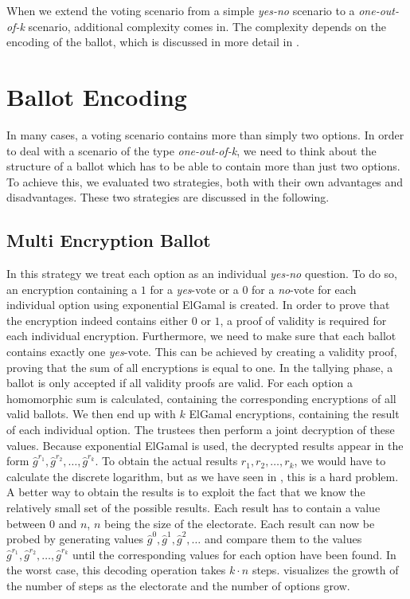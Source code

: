 \documentclass[numbers=noenddot, abstract=on, a4paper, headsepline,
footsepline, oneside, openright, draft=off, listof=leveldown]{scrreprt}
\begin{document}
When we extend the voting scenario from a simple \emph{yes-no} scenario to a
\emph{one-out-of-k} scenario, additional complexity comes in. The complexity
depends on the encoding of the ballot, which is discussed in more detail in
.

\section{Ballot Encoding}
\label{sec:ballotencoding}
In many cases, a voting scenario contains more than simply two options. In order
to deal with a scenario of the type \emph{one-out-of-k}, we need to think about
the structure of a ballot which has to be able to contain more than just two
options. To achieve this, we evaluated two strategies, both with their own
advantages and disadvantages. These two strategies are discussed in the
following.

\subsection{Multi Encryption Ballot}
\label{sec:multiencryptionballot}
In this strategy we treat each option as an individual \emph{yes-no}
question. To do so, an encryption containing a $1$ for a
\emph{yes}-vote or a $0$ for a \emph{no}-vote for each individual option using
exponential ElGamal is created. In order to prove that the encryption indeed
contains either $0$ or $1$, a proof of validity is required for each individual
encryption.
Furthermore, we need to make sure that each ballot contains exactly one
\emph{yes}-vote. This can be achieved by creating a validity proof, proving that
the sum of all encryptions is equal to one. In the
tallying phase, a ballot is only accepted if all validity proofs are valid. For
each option a homomorphic sum is calculated, containing the corresponding
encryptions of all valid ballots. We then end up with $k$ ElGamal encryptions,
containing the result of each individual option. The trustees then perform a
joint decryption of these values. Because exponential ElGamal is used, the
decrypted results appear in the form $\hat{g}^{r_1}, \hat{g}^{r_2}, \ldots,
\hat{g}^{r_k}$. To obtain the actual results $r_1, r_2, \ldots, r_k$, we would
have to calculate the discrete logarithm, but as
we have seen in , this is a hard problem. A better
way to obtain the results is to exploit the fact that we know the
relatively small set of the possible results. Each result has to contain a
value between $0$ and $n$, $n$ being the size of the electorate. Each result can
now be probed by generating values $\hat{g}^0, \hat{g}^1, \hat{g}^2, \ldots$ and
compare them to the values $\hat{g}^{r_1}, \hat{g}^{r_2}, \ldots,
\hat{g}^{r_k}$ until the corresponding values for each option have been found.
In the worst case, this decoding operation takes $k \cdot n$ steps.
 visualizes the growth of the number
of steps as the electorate and the number of options grow.
\end{document}
